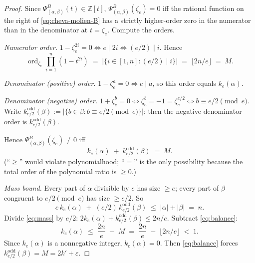 \documentclass[11pt]{article}
\theoremstyle{definition}
\theoremstyle{remark}
\DeclareMathOperator{\ord}{ord}
\newcommand{\zetae}{\zeta_e}
\newcommand{\ZZ}{\mathbb{Z}}
\newcommand{\PsiB}{\Psi^{B}}
\newcommand{\eps}{\varepsilon}
\begin{document}
\begin{proof}
Since $\PsiB_{(\alpha, \beta)}(t) \in \ZZ[t]$, $\PsiB_{(\alpha, \beta)}(\zetae) = 0$ iff the rational function on the right of \eqref{eq:cheva-molien-B} has a strictly higher-order zero in the numerator than in the denominator at $t = \zetae$. Compute the orders.

\smallskip

\emph{Numerator order.} $1 - \zetae^{2i} = 0 \iff e \mid 2i \iff (e/2) \mid i$. Hence
\[
  \ord_{\zetae} \prod_{i=1}^n(1 - t^{2i}) \;=\; \bigl|\{i \in [1, n] : (e/2) \mid i\}\bigr| \;=\; \lfloor 2n/e\rfloor \;=\; M.
\]

\emph{Denominator (positive) order.} $1 - \zetae^{a} = 0 \iff e \mid a$, so this order equals $k_e(\alpha)$.

\emph{Denominator (negative) order.} $1 + \zetae^{b} = 0 \iff \zetae^{b} = -1 = \zetae^{e/2} \iff b \equiv e/2 \pmod{e}$. Write $k_{e/2}^{\mathrm{odd}}(\beta) := |\{b \in \beta : b \equiv e/2 \pmod{e}\}|$; then the negative denominator order is $k_{e/2}^{\mathrm{odd}}(\beta)$.

\smallskip

Hence $\PsiB_{(\alpha,\beta)}(\zetae) \ne 0$ iff
\begin{equation}\label{eq:balance}
  k_e(\alpha) \;+\; k_{e/2}^{\mathrm{odd}}(\beta) \;=\; M.
\end{equation}
(``$\ge$'' would violate polynomialhood; ``$=$'' is the only possibility because the total order of the polynomial ratio is $\ge 0$.)

\emph{Mass bound.} Every part of $\alpha$ divisible by $e$ has size $\ge e$; every part of $\beta$ congruent to $e/2 \pmod{e}$ has size $\ge e/2$. So
\begin{equation}\label{eq:mass}
  e\, k_e(\alpha) \;+\; (e/2)\, k_{e/2}^{\mathrm{odd}}(\beta) \;\le\; |\alpha| + |\beta| \;=\; n.
\end{equation}
Divide \eqref{eq:mass} by $e/2$: $2 k_e(\alpha) + k_{e/2}^{\mathrm{odd}}(\beta) \le 2n/e$. Subtract \eqref{eq:balance}:
\[
  k_e(\alpha) \;\le\; \frac{2n}{e} \;-\; M \;=\; \frac{2n}{e} \;-\; \lfloor 2n/e\rfloor \;<\; 1.
\]
Since $k_e(\alpha)$ is a nonnegative integer, $k_e(\alpha) = 0$. Then \eqref{eq:balance} forces $k_{e/2}^{\mathrm{odd}}(\beta) = M = 2k' + \eps$.


\end{proof}
\end{document}
